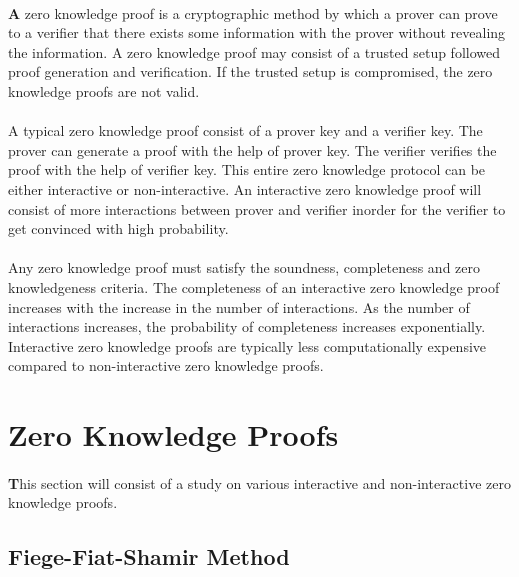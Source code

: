 \documentclass[12pt]{article}
\theoremstyle{definition}
\theoremstyle{remark}
\theoremstyle{definition}
\begin{document}
\paragraph*{}
\textbf A zero knowledge proof is a cryptographic method by which a prover can prove to a verifier that there exists some information with the prover without revealing the information. A zero knowledge proof may consist of a trusted setup followed proof generation and verification. If the trusted setup is compromised, the zero knowledge proofs are not valid.
\\
\\
A typical zero knowledge proof consist of a prover key and a verifier key. The prover can generate a proof with the help of prover key. The verifier verifies the proof with the help of verifier key. This entire zero knowledge protocol can be either interactive or non-interactive. An interactive zero knowledge proof will consist of more interactions between prover and verifier inorder for the verifier to get convinced with high probability.
\\
\\
Any zero knowledge proof must satisfy the soundness, completeness and zero knowledgeness criteria. The completeness of an interactive zero knowledge proof increases with the increase in the number of interactions. As the number of interactions increases, the probability of completeness increases exponentially. Interactive zero knowledge proofs are typically less computationally expensive compared to non-interactive zero knowledge proofs.




\newpage




\section{Zero Knowledge Proofs}
\paragraph*{}
\textbf This section will consist of a study on various interactive and non-interactive zero knowledge proofs.



\subsection{Fiege-Fiat-Shamir Method}
\end{document}
